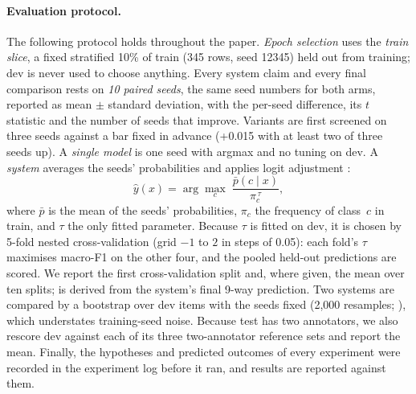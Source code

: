 \paragraph{Evaluation protocol.}
The following protocol holds throughout the paper.
\emph{Epoch selection} uses the \emph{train slice}, a fixed stratified 10\% of train (345 rows, seed 12345) held out from training; dev is never used to choose anything.
Every system claim and every final comparison rests on \emph{10 paired seeds}, the same seed numbers for both arms, reported as mean $\pm$ standard deviation, with the per-seed difference, its $t$ statistic and the number of seeds that improve.
Variants are first screened on three seeds against a bar fixed in advance (+0.015 with at least two of three seeds up).
A \emph{single model} is one seed with argmax and no tuning on dev.
A \emph{system} averages the seeds' probabilities and applies logit adjustment \citep{menon2021longtail}:
\begin{equation}
  \hat{y}(x) = \arg\max_{c}\; \frac{\bar{p}(c \mid x)}{\pi_c^{\,\tau}},
  \label{eq:la}
\end{equation}
where $\bar{p}$ is the mean of the seeds' probabilities, $\pi_c$ the frequency of class~$c$ in train, and $\tau$ the only fitted parameter.
Because $\tau$ is fitted on dev, it is chosen by 5-fold nested cross-validation (grid $-1$ to $2$ in steps of 0.05): each fold's $\tau$ maximises \Stwo{} macro-F1 on the other four, and the pooled held-out predictions are scored.
We report the first cross-validation split and, where given, the mean over ten splits; \Sone{} is derived from the system's final 9-way prediction.
Two systems are compared by a bootstrap over dev items with the seeds fixed (2,000 resamples; \citealp{efron1993bootstrap}), which understates training-seed noise.
Because test has two annotators, we also rescore dev against each of its three two-annotator reference sets and report the mean.
Finally, the hypotheses and predicted outcomes of every experiment were recorded in the experiment log before it ran, and results are reported against them.
